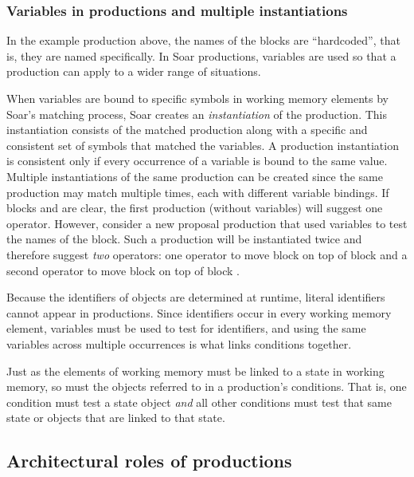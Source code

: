 \subsubsection{Variables in productions and multiple instantiations}

In the example production above, the names of the blocks are ``hardcoded'',
that is, they are named specifically. In Soar productions, variables are used
so that a production can apply to a wider range of situations.

 When variables are bound to specific symbols in working memory elements by Soar’s matching process, Soar creates an \emph{instantiation} of the production. This instantiation consists of the matched production along with a specific and consistent set of symbols that matched the variables. A production instantiation is consistent only if every occurrence of a variable is bound to the same value. Multiple instantiations of the same production can be created since the same production may match multiple times, each with different variable bindings. If blocks  and  are clear, the first production (without variables) will suggest one operator. However, consider a new proposal production that used variables to test the names of the block.  Such a production will be instantiated twice and therefore suggest \textit{two} operators: one operator to move block  on top of block  and a second operator to move block  on top of block .

Because the identifiers of objects are determined at runtime, literal
identifiers cannot appear in productions. Since identifiers occur in
every working memory element, variables must be used to test for
identifiers, and using the same variables across multiple occurrences is what links conditions together.

Just as the elements of working memory must be linked to a state 
in working memory, so must the objects referred to in a production's
conditions. That is, one condition must test a state object 
\emph{and} all other conditions must test that same state or objects that
are linked to that state.

\subsection{Architectural roles of productions}
\label{ARCH-pm-roles}

